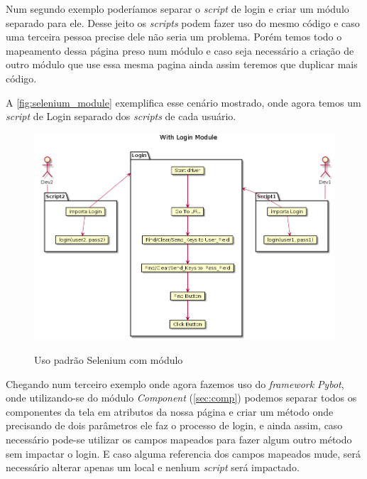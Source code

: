     Num segundo exemplo poderíamos separar o \emph{script} de login e criar um módulo separado para ele. Desse jeito
    os \emph{scripts} podem fazer uso do mesmo código e caso uma terceira pessoa precise dele não seria um problema.
    Porém temos todo o mapeamento dessa página preso num módulo e caso seja necessário a criação de outro
    módulo que use essa mesma pagina ainda assim teremos que duplicar mais código.

    A \autoref{fig:selenium_module} exemplifica esse cenário mostrado, onde agora temos um \emph{script} de Login
    separado dos \emph{scripts} de cada usuário.

    \begin{figure}[H]
        \vspace*{0,3cm}
        \centering
        \caption{Uso padrão Selenium com módulo}
        \includegraphics[width=1\textwidth]{./04-figuras/page_object_module}
        \label{fig:selenium_module}
    \end{figure}
    \vspace*{-0,9cm}
    {\raggedright {}}

    Chegando num terceiro exemplo onde agora fazemos uso do \textit{framework} \emph{Pybot}, onde utilizando-se do
    módulo \emph{Component} (\autoref{sec:comp}) podemos separar todos os componentes da tela em atributos da nossa página
    e criar um método onde precisando de dois parâmetros ele faz o processo de login, e ainda assim, caso
    necessário pode-se utilizar os campos mapeados para fazer algum outro método sem impactar o login.
    E caso alguma referencia dos campos mapeados mude, será necessário alterar apenas um local e nenhum \emph{script}
    será impactado.

